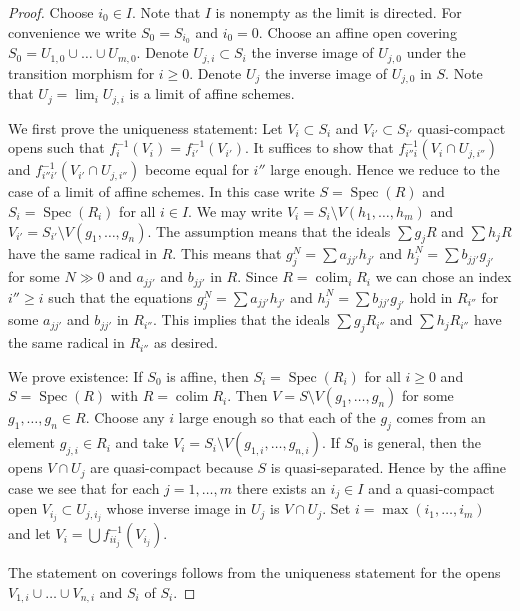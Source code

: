 \documentclass[10pt,a4paper]{amsart}
\theoremstyle{plain}
\theoremstyle{definition}
\theoremstyle{remark}
\numberwithin{equation}{subsection}
\def\lim{\mathop{\mathrm{lim}}\nolimits}
\def\colim{\mathop{\mathrm{colim}}\nolimits}
\def\Spec{\mathop{\mathrm{Spec}}}
\begin{document}
\begin{proof}
Choose $i_0 \in I$. Note that $I$ is nonempty as the limit is directed.
For convenience we write $S_0 = S_{i_0}$ and $i_0 = 0$.
Choose an affine open covering $S_0 = U_{1, 0} \cup \ldots \cup U_{m, 0}$.
Denote $U_{j, i} \subset S_i$ the inverse image of $U_{j, 0}$
under the transition morphism for $i \geq 0$.
Denote $U_j$ the inverse image of $U_{j, 0}$ in $S$.
Note that $U_j = \lim_i U_{j, i}$ is a limit of affine
schemes.

\medskip\noindent
We first prove the uniqueness statement: Let
$V_i \subset S_i$ and $V_{i'} \subset S_{i'}$
quasi-compact opens such that $f_i^{-1}(V_i) = f_{i'}^{-1}(V_{i'})$.
It suffices to show that $f_{i''i}^{-1}(V_i \cap U_{j, i''})$ and
$f_{i''i'}^{-1}(V_{i'} \cap U_{j, i''})$ become equal
for $i''$ large enough. Hence we reduce to the case
of a limit of affine schemes. In this case write
$S = \Spec(R)$ and $S_i = \Spec(R_i)$ for all $i \in I$.
We may write $V_i = S_i \setminus V(h_1, \ldots, h_m)$
and $V_{i'} = S_{i'} \setminus V(g_1, \ldots, g_n)$.
The assumption means that the ideals
$\sum g_jR$ and $\sum h_jR$ have the same radical
in $R$. This means that $g_j^N = \sum a_{jj'}h_{j'}$ and
$h_j^N = \sum b_{jj'} g_{j'}$ for some $N \gg 0$ and $a_{jj'}$
and $b_{jj'}$ in $R$.
Since $R = \colim_i R_i$ we can chose an index
$i'' \geq i$ such that the equations
$g_j^N = \sum a_{jj'}h_{j'}$ and
$h_j^N = \sum b_{jj'} g_{j'}$ hold in $R_{i''}$ for some
$a_{jj'}$ and $b_{jj'}$ in $R_{i''}$. This implies that
the ideals $\sum g_jR_{i''}$ and $\sum h_jR_{i''}$ have the same radical
in $R_{i''}$ as desired.

\medskip\noindent
We prove existence: If $S_0$ is affine, then $S_i = \Spec(R_i)$ for all
$i \geq 0$ and $S = \Spec(R)$ with $R = \colim R_i$. Then
$V = S \setminus V(g_1, \ldots, g_n)$ for some $g_1, \ldots, g_n \in R$.
Choose any $i$ large enough so that each of the $g_j$ comes from an
element $g_{j, i} \in R_i$ and take
$V_i = S_i \setminus V(g_{1, i}, \ldots, g_{n, i})$.
If $S_0$ is general, then the opens $V \cap U_j$
are quasi-compact because $S$ is quasi-separated. Hence by the
affine case we see that for each $j = 1, \ldots, m$
there exists an $i_j \in I$ and a quasi-compact open
$V_{i_j} \subset U_{j, i_j}$ whose inverse image in $U_j$
is $V \cap U_j$. Set $i = \max(i_1, \ldots, i_m)$
and let $V_i = \bigcup f_{ii_j}^{-1}(V_{i_j})$.

\medskip\noindent
The statement on coverings follows from the uniqueness statement
for the opens $V_{1, i} \cup \ldots \cup V_{n, i}$ and $S_i$ of $S_i$.
\end{proof}
\end{document}
